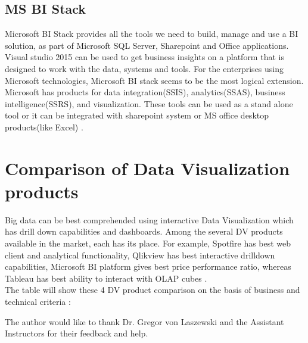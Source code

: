 \subsection*{MS BI Stack}

Microsoft BI Stack provides all the tools we need to build, manage and use a BI solution, as part of Microsoft SQL Server, Sharepoint and Office applications. Visual studio 2015 can be used to get business insights on a platform that is designed to work with the data, systems and tools. For the enterprises using Microsoft technologies, Microsoft BI stack seems to be the most logical extension. Microsoft has products for data integration(SSIS), analytics(SSAS), business intelligence(SSRS), and visualization. These tools can be used as a stand alone tool or it can be integrated with sharepoint system or MS office desktop products(like Excel) \cite{MS}.


\section{Comparison of Data Visualization products}

Big data can be best comprehended using interactive Data Visualization which has drill down capabilities and dashboards. Among the several DV products available in the market, each has its place. For example, Spotfire has best web client and analytical functionality, Qlikview has best interactive drilldown capabilities, Microsoft BI platform gives best price performance ratio, whereas Tableau has best ability to interact with OLAP cubes \cite{compare}.\\ The table will show these 4 DV product comparison on the basis of business and technical criteria :







\begin{acks}

  The author would like to thank Dr. Gregor von Laszewski and the Assistant Instructors for their feedback and help.
\end{acks}


 



